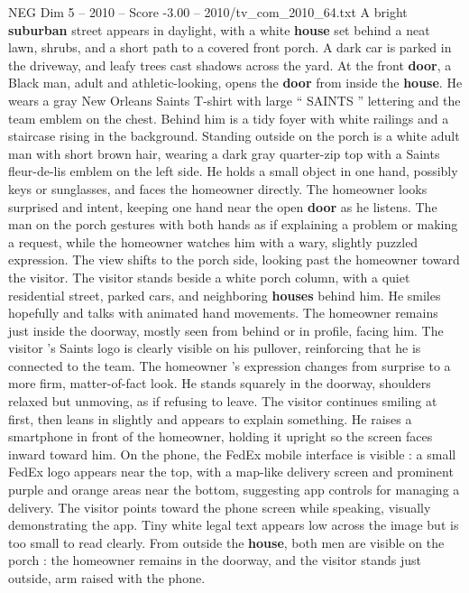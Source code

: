 \begin{textsample}{NEG Dim 5 – 2010 – Score -3.00 – 2010/tv\_com\_2010\_64.txt}  \label{ex:f5_neg_056}
A bright \textbf{suburban} street appears in daylight, with a white \textbf{house} set behind a neat lawn, shrubs, and a short path to a covered front porch.
A dark car is parked in the driveway, and leafy trees cast shadows across the yard.
At the front \textbf{door}, a Black man, adult and athletic-looking, opens the \textbf{door} from inside the \textbf{house}.
He wears a gray New Orleans Saints T-shirt with large “ SAINTS ” lettering and the team emblem on the chest.
Behind him is a tidy foyer with white railings and a staircase rising in the background.
Standing outside on the porch is a white adult man with short brown hair, wearing a dark gray quarter-zip top with a Saints fleur-de-lis emblem on the left side.
He holds a small object in one hand, possibly keys or sunglasses, and faces the homeowner directly.
The homeowner looks surprised and intent, keeping one hand near the open \textbf{door} as he listens.
The man on the porch gestures with both hands as if explaining a problem or making a request, while the homeowner watches him with a wary, slightly puzzled expression.
The view shifts to the porch side, looking past the homeowner toward the visitor.
The visitor stands beside a white porch column, with a quiet residential street, parked cars, and neighboring \textbf{houses} behind him.
He smiles hopefully and talks with animated hand movements.
The homeowner remains just inside the doorway, mostly seen from behind or in profile, facing him.
The visitor ’s Saints logo is clearly visible on his pullover, reinforcing that he is connected to the team.
The homeowner ’s expression changes from surprise to a more firm, matter-of-fact look.
He stands squarely in the doorway, shoulders relaxed but unmoving, as if refusing to leave.
The visitor continues smiling at first, then leans in slightly and appears to explain something.
He raises a smartphone in front of the homeowner, holding it upright so the screen faces inward toward him.
On the phone, the FedEx mobile interface is visible : a small FedEx logo appears near the top, with a map-like delivery screen and prominent purple and orange areas near the bottom, suggesting app controls for managing a delivery.
The visitor points toward the phone screen while speaking, visually demonstrating the app.
Tiny white legal text appears low across the image but is too small to read clearly.
From outside the \textbf{house}, both men are visible on the porch : the homeowner remains in the doorway, and the visitor stands just outside, arm raised with the phone.

\end{textsample}
